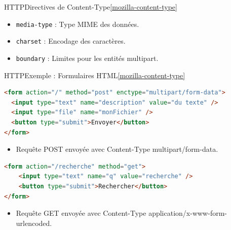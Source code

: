 \documentclass{beamer}
\begin{document}
    \begin{frame}{HTTP}{Directives de Content-Type\cref{mozilla-content-type}}
        \begin{itemize}
            \item \lstinline{media-type} : Type MIME des données.
            \item \lstinline{charset} : Encodage des caractères.
            \item \lstinline{boundary} : Limites pour les entités multipart.
        \end{itemize}
    \end{frame}

    \begin{frame}[fragile]{HTTP}{Exemple : Formulaires HTML\cref{mozilla-content-type}}
        \begin{lstlisting}[language=HTML]
<form action="/" method="post" enctype="multipart/form-data">
  <input type="text" name="description" value="du texte" />
  <input type="file" name="monFichier" />
  <button type="submit">Envoyer</button>
</form>
        \end{lstlisting}
        \begin{itemize}
            \item Requête POST envoyée avec Content-Type multipart/form-data.
        \end{itemize}
        \begin{lstlisting}[language=HTML]
<form action="/recherche" method="get">
    <input type="text" name="q" value="recherche" />
    <button type="submit">Rechercher</button>
</form>
        \end{lstlisting}
        \begin{itemize}
            \item Requête GET envoyée avec Content-Type application/x-www-form-urlencoded.
        \end{itemize}

    \end{frame}
\end{document}
